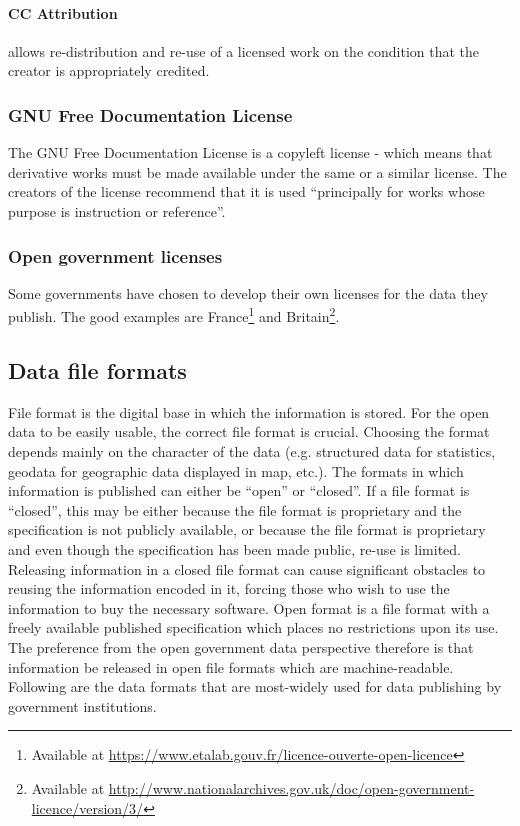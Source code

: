 \documentclass[thesis=B,english]{sprlajur-slovakopendata}[2018/05/12]
\begin{document}
\paragraph{CC Attribution}
allows re-distribution and re-use of a licensed work on the condition that the creator is appropriately credited.
\subsubsection{GNU Free Documentation License}
The GNU Free Documentation License is a copyleft license - which means that derivative works must be made available under the same or a similar license. The creators of the license recommend that it is used ``principally for works whose purpose is instruction or reference''.
\subsubsection{Open government licenses}
\label{opengovernmentlicense}
Some governments have chosen to develop their own licenses for the data they publish. The good examples are France\footnote{Available at \url{https://www.etalab.gouv.fr/licence-ouverte-open-licence}} and Britain\footnote{Available at \url{http://www.nationalarchives.gov.uk/doc/open-government-licence/version/3/}}.
\subsection{Data file formats}
\label{fileformats}
File format is the digital base in which the information is stored. For the open data to be easily usable, the correct file format is crucial. Choosing the format depends mainly on the character of the data (e.g. structured data for statistics, geodata for geographic data displayed in map, etc.). The formats in which information is published can either be ``open'' or ``closed''. If a file format is ``closed'', this may be either because the file format is proprietary and the specification is not publicly available, or because the file format is proprietary and even though the specification has been made public, re-use is limited. Releasing information in a closed file format can cause significant obstacles to reusing the information encoded in it, forcing those who wish to use the information to buy the necessary software. Open format is a file format with a freely available published specification which places no restrictions upon its use. The preference from the open government data perspective therefore is that information be released in open file formats which are machine-readable. Following are the data formats that are most-widely used for data publishing by government institutions.\cite{opendatahandbookfileformats}
	 
\end{document}
